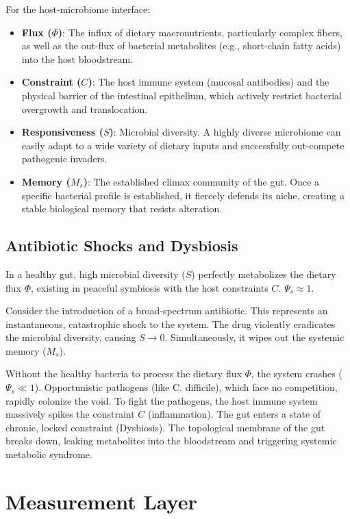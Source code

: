 \documentclass[11pt,a4paper]{article}
\begin{document}
For the host-microbiome interface:
\begin{itemize}
    \item \textbf{Flux ($\Phi$)}: The influx of dietary macronutrients, particularly complex fibers, as well as the out-flux of bacterial metabolites (e.g., short-chain fatty acids) into the host bloodstream.
    \item \textbf{Constraint ($C$)}: The host immune system (mucosal antibodies) and the physical barrier of the intestinal epithelium, which actively restrict bacterial overgrowth and translocation.
    \item \textbf{Responsiveness ($S$)}: Microbial diversity. A highly diverse microbiome can easily adapt to a wide variety of dietary inputs and successfully out-compete pathogenic invaders.
    \item \textbf{Memory ($M_s$)}: The established climax community of the gut. Once a specific bacterial profile is established, it fiercely defends its niche, creating a stable biological memory that resists alteration.
\end{itemize}

\subsection{Antibiotic Shocks and Dysbiosis}
In a healthy gut, high microbial diversity ($S$) perfectly metabolizes the dietary flux $\Phi$, existing in peaceful symbiosis with the host constraints $C$. $\Psi_s \approx 1$.

Consider the introduction of a broad-spectrum antibiotic. This represents an instantaneous, catastrophic shock to the system. The drug violently eradicates the microbial diversity, causing $S \to 0$. Simultaneously, it wipes out the systemic memory ($M_s$).

Without the healthy bacteria to process the dietary flux $\Phi$, the system crashes ($\Psi_s \ll 1$). Opportunistic pathogens (like C. difficile), which face no competition, rapidly colonize the void. To fight the pathogens, the host immune system massively spikes the constraint $C$ (inflammation). The gut enters a state of chronic, locked constraint (Dysbiosis). The topological membrane of the gut breaks down, leaking metabolites into the bloodstream and triggering systemic metabolic syndrome.



\section{Measurement Layer}
\end{document}

